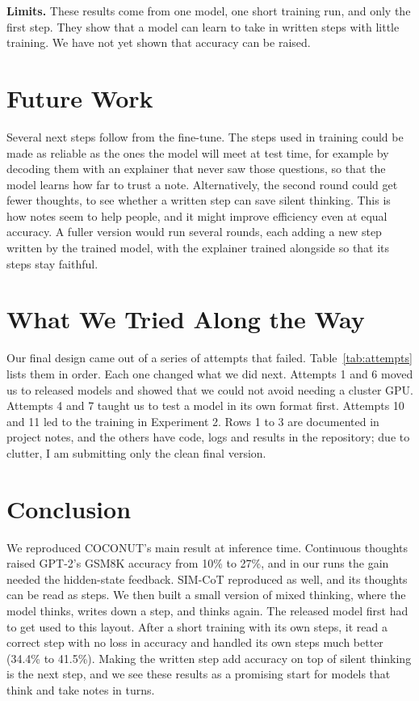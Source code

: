 \documentclass[10pt,letterpaper]{article}
\begin{document}
\newline \noindent
\textbf{Limits.} These results come from one model, one short training run, and only the first step. They show that a model can learn to take in written steps with little training. We have not yet shown that accuracy can be raised.

\section{Future Work}
Several next steps follow from the fine-tune. The steps used in training could be made as reliable as the ones the model will meet at test time, for example by decoding them with an explainer that never saw those questions, so that the model learns how far to trust a note. \newline Alternatively, the second round could get fewer thoughts, to see whether a written step
can save silent thinking. This is how notes seem to help people, and it might improve efficiency even at equal accuracy. A fuller version would run several rounds, each adding a new step written by the trained model, with the explainer trained alongside so that its steps stay faithful.

\section{What We Tried Along the Way}
Our final design came out of a series of attempts that failed. Table~\ref{tab:attempts} lists them in order. Each one
changed what we did next. Attempts 1 and 6 moved us to released models and showed that we could not avoid needing a cluster GPU. \newline
Attempts 4 and 7 taught us to test a model in its own format first. \newline
Attempts 10 and 11 led to the training in Experiment 2. Rows 1 to 3 are documented in project notes, and the others have code, logs and results in the repository; due to clutter, I am submitting only the clean final version.

\section{Conclusion}
We reproduced COCONUT's main result at inference time. Continuous thoughts raised GPT-2's GSM8K accuracy from 10\% to
27\%, and in our runs the gain needed the hidden-state feedback. SIM-CoT reproduced as well, and its thoughts
can be read as steps. \newline
We then built a small version of mixed thinking, where the model thinks, writes down a step, and
thinks again. The released model first had to get used to this layout. After a short training with its own steps, it read a correct step with no loss in accuracy and handled its own steps much better (34.4\% to 41.5\%). Making the written step add accuracy on top of silent thinking is the next step, and we see these results as a promising start for models that think and take notes in turns.
\end{document}
